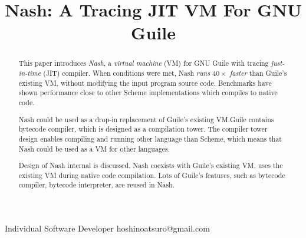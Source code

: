 \documentclass[preprint]{sigplanconf}
\begin{document}
\setlength{\pdfpageheight}{\paperheight}
\setlength{\pdfpagewidth}{\paperwidth}




\title{Nash: A Tracing JIT VM For GNU Guile}

           {Individual Software Developer}
           {hoshinoatsuro@gmail.com}

\maketitle

\begin{abstract}

This paper introduces \textit{Nash}, a \textit{virtual machine} (VM) for GNU
Guile with tracing \textit{just-in-time} (JIT) compiler. When conditions were
met, Nash \textit{runs $40\times$ faster} than Guile's existing VM, without
modifying the input program source code. Benchmarks have shown performance
close to other Scheme implementations which compiles to native code.

Nash could be used as a drop-in replacement of Guile's existing VM.\@ Guile
contains bytecode compiler, which is designed as a compilation tower. The
compiler tower design enables compiling and running other language than
Scheme, which means that Nash could be used as a VM for other languages.

Design of Nash internal is discussed. Nash coexists with Guile's existing VM,
uses the existing VM during native code compilation. Lots of Guile's features,
such as bytecode compiler, bytecode interpreter, are reused in Nash.

\end{abstract}
\end{document}
